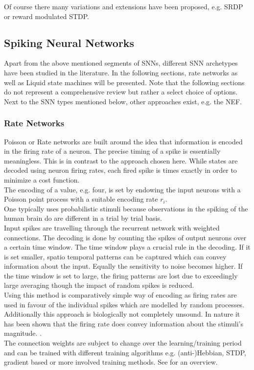 Of course there many variations and extensions have been proposed, e.g. \ac{SRDP}\cite{kempter_hebbian_1999} or reward modulated \ac{STDP}\cite{legenstein_learning_2008}.

\subsection{Spiking Neural Networks}
Apart from the above mentioned segments of \acp{SNN}, different \ac{SNN} archetypes have been studied in the literature. In the following sections, rate networks as well as Liquid state machines will be presented. Note that the following sections do not represent a comprehensive review but rather a select choice of options. Next to the \ac{SNN} types mentioned below, other approaches exist, e.g. the \ac{NEF}\cite{eliasmith_neural_2004}.
\subsubsection{Rate Networks}
Poisson or Rate networks are built around the idea that information is encoded in the firing rate of a neuron. The precise timing of a spike is essentially meaningless\cite{brette_philosophy_2015}. This is in contrast to the approach chosen here. While states are decoded using neuron firing rates, each fired spike is times exactly in order to minimize a cost function.\\
The encoding of a value, e.g. four, is set by endowing the input neurons with a Poisson point process with a suitable encoding rate $r_i$\cite{deneve_efficient_2016}.\\
One typically uses probabilistic stimuli because observations in the spiking of the human brain do are different in a trial by trial basis.\\
Input spikes are travelling through the recurrent network with weighted connections. The decoding is done by counting the spikes of output neurons over a certain time window. The time window plays a crucial rule in the decoding. If it is set smaller, spatio temporal patterns can be captured which can convey information about the input. Equally the sensitivity to noise becomes higher. If the time window is set to large, the firing patterns are lost due to exceedingly large averaging though the impact of random spikes is reduced.\\
Using this method is comparatively simple way of encoding as firing rates are used in favour of the individual spikes which are modelled by random processes. Additionally this approach is biologically not completely unsound. In nature it has been shown that the firing rate does convey information about the stimuli's magnitude. \cite{adrian_impulses_1926}.\\
The connection weights are subject to change over the learning/training period\cite{almomani_comparative_2019} and can be trained with different training algorithms e.g. (anti-)Hebbian, \ac{STDP}, gradient based or more involved training methods\cite{demin_recurrent_2018}. See \cite{yi_learning_2023} for an overview.\\


